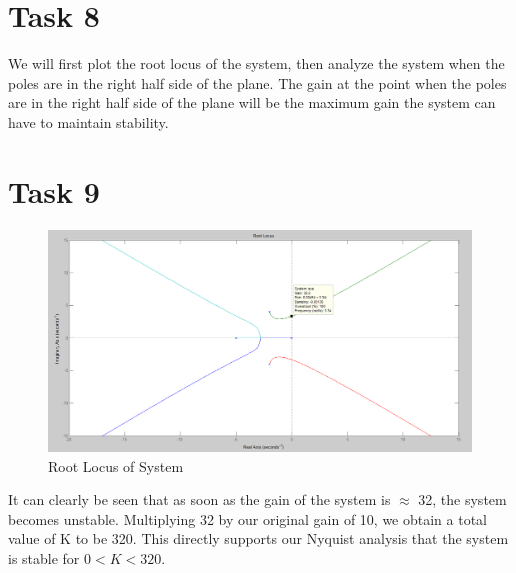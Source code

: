 \documentclass[12pt,letter]{article}
\begin{document}
\section*{Task 8}
We will first plot the root locus of the system, then analyze the system when the poles are in the right half side of the plane. The gain at the point when the poles are in the right half side of the plane will be the maximum gain the system can have to maintain stability.

\section*{Task 9}

\begin{figure}[H]
	\centering
	\includegraphics[width=1\linewidth]{"Task 7"}
	\caption{Root Locus of System}
	\label{fig:Task7}
	\end{figure}
	
	\noindent It can clearly be seen that as soon as the gain of the system is $\approx$ 32, the system becomes unstable. Multiplying 32 by our original gain of 10, we obtain a total value of K to be 320. This directly supports our Nyquist analysis that the system is stable for $0 < K < 320$.
\end{document}

